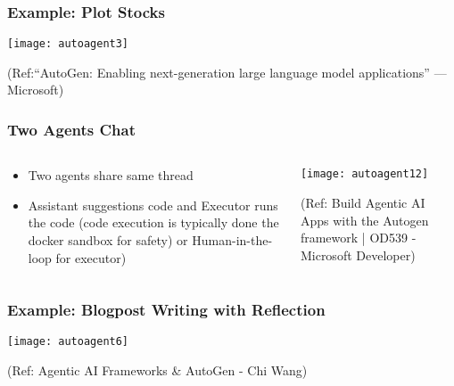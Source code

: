 \begin{frame}[fragile]\frametitle{Example: Plot Stocks}
	
	\begin{center}
	\texttt{[image: autoagent3]}
	\end{center}
	
{\tiny (Ref:“AutoGen: Enabling next-generation large language model applications” — Microsoft)}
\end{frame}


\begin{frame}[fragile]\frametitle{Two Agents Chat}

\begin{columns}
    \begin{column}[T]{0.6\linewidth}

		  \begin{itemize}
		  \item Two agents share same thread
		  \item Assistant suggestions code and Executor runs the code (code execution is typically done the docker sandbox for safety) or Human-in-the-loop for executor)
		  \end{itemize}

    \end{column}
    \begin{column}[T]{0.4\linewidth}

		\begin{center}
		\texttt{[image: autoagent12]}
		\end{center}
	
	  {\tiny (Ref: Build Agentic AI Apps with the Autogen framework | OD539 - Microsoft Developer)}

    \end{column}
  \end{columns}
  
\end{frame}


 
\begin{frame}[fragile]\frametitle{Example: Blogpost Writing with Reflection}
		\begin{center}
		\texttt{[image: autoagent6]}
		\end{center}
		
		{\tiny (Ref: Agentic AI Frameworks \& AutoGen - Chi Wang)}
\end{frame}
  
